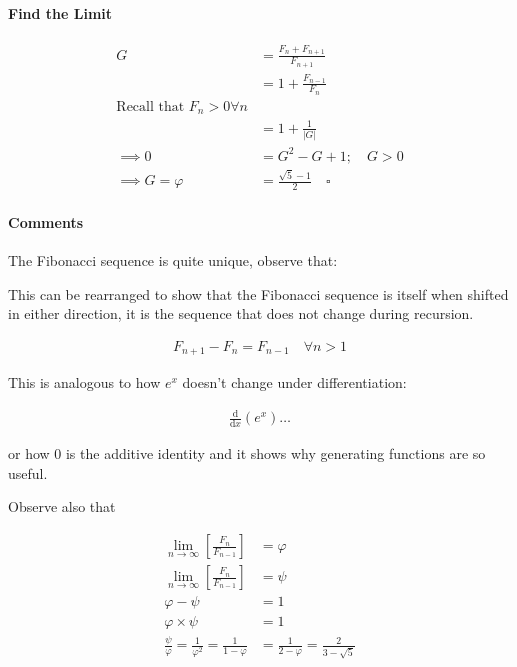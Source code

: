 \documentclass[11pt]{article}
\begin{document}
\paragraph{Find the Limit}
\label{sec:org49450ab}
$$\begin{aligned}
G &= \frac{F_{n} +  F_{n+  1} }{F_{n+  1} } \\
&= 1 +  \frac{F_{n- 1} }{F_n} \\
\text{Recall that $F_n > 0 \forall n$}\\
&=  1 +  \frac{1}{    \left\lvert G \right\rvert } \\
 \implies  0 &= G^2- G +  1; \quad G > 0  \\
  \implies  G = \varphi &=  \frac{\sqrt{5} - 1  }{2} \quad  \square
\end{aligned}$$


\paragraph{Comments}
\label{sec:orgcf59613}

The Fibonacci sequence is quite unique, observe that:

This can be rearranged to show that the Fibonacci sequence is itself
when shifted in either direction, it is the sequence that does not
change during recursion.

\[\begin{aligned}
F_{n+ 1} - F_{n} = F_{n- 1} \quad \forall n > 1
\end{aligned}\]

This is analogous to how \(e^x\) doesn't change under differentiation:

$$\begin{aligned}
\frac{\mathrm{d} }{\mathrm{d} x}\left( e^x \right) \ldots
\end{aligned}$$

or how 0 is the additive identity and it shows why generating functions
are so useful.

Observe also that

$$\begin{aligned}
\lim_{n     \rightarrow \infty }\left[ \frac{F_n}{F_{n- 1} }  \right] &= \varphi \\
\lim_{n     \rightarrow \infty }\left[ \frac{F_n}{F_{n- 1} }  \right] &= \psi \\
\varphi - \psi &=  1 \\
\varphi \times  \psi  &= 1 \\
\frac{\psi}{\varphi}  = \frac{1}{\varphi^2} = \frac{1}{1-\varphi} &= \frac{1}{2-\varphi} = \frac{2}{3 - \sqrt{5}  }
\end{aligned}$$
\end{document}

